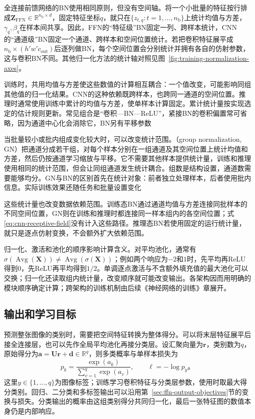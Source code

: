 全连接前馈网络的BN使用相同原则，但没有空间轴。将一个小批量的特征按行排成$\bm Z_{\mathrm{FFN}}\in\mathbb R^{n_{\mathrm b}\times d}$，固定特征坐标$q$，就只在$\{z_{t,q}:t=1,\ldots,n_{\mathrm b}\}$上统计均值与方差，$\gamma_q,\beta_q$在样本间共享。因此，FFN的“特征级”BN固定一列、跨样本统计，CNN的“通道级”BN固定一个通道、跨样本和空间位置统计。若把卷积特征展平成$n_{\mathrm b}\times(h'w'c_{\mathrm{out}})$后逐列做BN，每个空间位置会分别统计并拥有各自的仿射参数，这与卷积BN不同。其他归一化方法的统计轴对照见图~\ref{fig:training-normalization-axes}。

训练时，共用均值与方差使这些数值的计算相互耦合：一个值改变，可能影响同组其他值的归一化结果。CNN的这种依赖既跨样本，也跨同一通道的空间位置。推理时通常使用训练中累计的均值与方差，使单样本计算固定。累计统计量按实现选定的估计规则更新。常见组合是“卷积—BN—ReLU”，紧接BN的卷积偏置常可省略，因为通道中心化会消除它，BN另有平移参数

当批量较小或批内组成变化较大时，可以改变统计范围。（group normalization, GN）把通道分成若干组，对每个样本分别在一组通道及其空间位置上统计均值和方差，然后仍按通道学习缩放与平移。它不需要其他样本提供统计量，训练和推理使用相同的统计范围，但会让同组通道发生统计耦合。组数是结构设置，通道数需要能够均分。GN与BN的区别首先在统计对象：前者独立处理样本，后者使用批内信息。实际训练效果还随任务和批量设置变化

这些统计量也改变数据依赖范围。训练态BN通过通道均值与方差连接同批样本的不同空间位置，GN则在训练和推理时都连接同一样本组内的各空间位置；式\eqref{eq:cnn-receptive-field}没有计入这些路径。推理态BN若使用固定的运行统计量，就只是逐点仿射变换，不会额外扩大依赖范围。

归一化、激活和池化的顺序影响计算含义。对平均池化，通常有$\sigma(\operatorname{Avg}(\bm X))\neq\operatorname{Avg}(\sigma(\bm X))$；例如两个响应为$-2$和$1$时，先平均再ReLU得到$0$，先ReLU再平均得到$1/2$。单调逐点激活与不含额外填充值的最大池化可以交换；归一化还读取组内统计量，改变顺序就可能改变输出。各架构因而用明确的模块顺序确定计算；跨架构的训练机制由后续《神经网络的训练》章展开。

\subsection{输出和学习目标}
\label{sec:cnn-output-objectives}

预测整张图像的类别时，需要把空间特征转换为整体得分。可以将末层特征展平后接全连接层，也可以先作全局平均池化再接分类层。设汇聚向量为$\bm r$，类别数为$q$，原始得分为$\bm a=\bm U\bm r+\bm d\in\mathbb R^q$，则多类概率与单样本损失为
\begin{equation}
  p_k=\frac{\exp(a_k)}{\sum_{v=1}^{q}\exp(a_v)},\qquad
  \ell=-\log p_y\text{。}
  \label{eq:cnn-image-classification}
\end{equation}
这里$y\in\{1,\ldots,q\}$为图像标签；训练学习卷积特征与分类层参数，使用时取最大得分类别。回归、二分类和多标签输出可以沿用第~\ref{sec:ffn-output-objectives}节的变换与损失。分类输出的概率由这组类别得分共同归一化，最后一张特征图的数值本身仍是内部响应。

